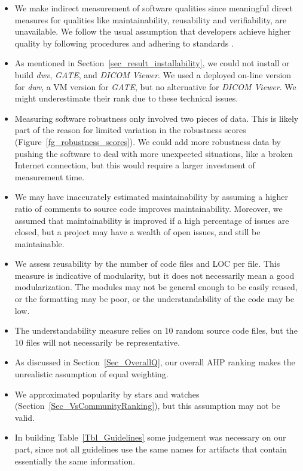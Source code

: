 \documentclass[11pt]{article}
\begin{document}
\begin{itemize}
\item We make indirect measurement of software qualities since meaningful direct
measures for qualities like maintainability, reusability and verifiability, are
unavailable.  We follow the usual assumption that developers achieve higher
quality by following procedures and adhering to standards \citep[p.\
112]{VanVliet2000}.
\item As mentioned in Section~\ref{sec_result_installability}, we could not
install or build \textit{dwv}, \textit{GATE}, and \textit{DICOM Viewer}. We used
a deployed on-line version for \textit{dwv}, a VM version for \textit{GATE}, but
no alternative for \textit{DICOM Viewer}. We might underestimate their rank due
to these technical issues.
\item Measuring software robustness only involved two pieces of data. This is
likely part of the reason for limited variation in the robustness scores
(Figure~\ref{fg_robustness_scores}). We could add more robustness data by
pushing the software to deal with more unexpected situations, like a broken
Internet connection, but this would require a larger investment of measurement
time. 
\item We may have inaccurately estimated maintainability by assuming a higher
ratio of comments to source code improves maintainability. Moreover, we assumed
that maintainability is improved if a high percentage of issues are closed, but
a project may have a wealth of open issues, and still be maintainable.
\item We assess reusability by the number of code files and LOC per file. This
measure is indicative of modularity, but it does not necessarily mean a good
modularization. The modules may not be general enough to be easily reused, or
the formatting may be poor, or the understandability of the code may be low.
\item The understandability measure relies on 10 random source code files, but
the 10 files will not necessarily be representative. 
\item As discussed in Section~\ref{Sec_OverallQ}, our overall AHP ranking makes
the unrealistic assumption of equal weighting.
\item We approximated popularity by stars and watches
(Section~\ref{Sec_VsCommunityRanking}), but this assumption may not be valid. 
\item In building Table~\ref{Tbl_Guidelines} some judgement was necessary on our
part, since not all guidelines use the same names for artifacts that contain
essentially the same information.
\end{itemize}
\end{document}
